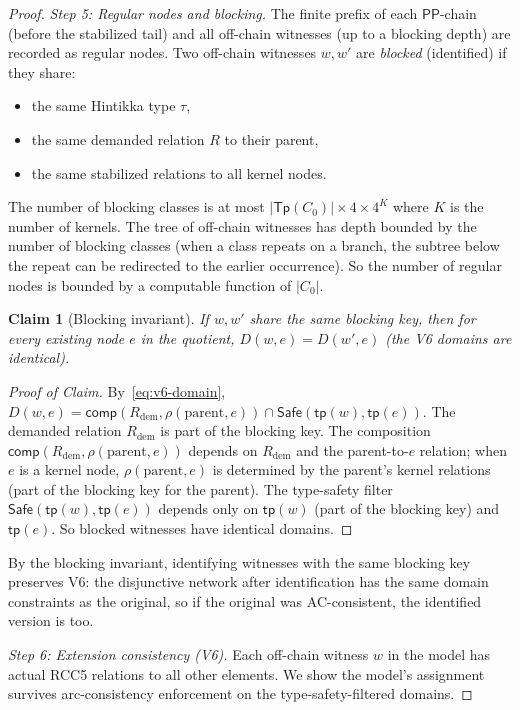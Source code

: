 \documentclass[a4paper,11pt]{article}
\newtheorem{claim}[theorem]{Claim}
\theoremstyle{definition}
\newcommand{\PP}{\ensuremath{\mathsf{PP}}}
\newcommand{\comp}{\ensuremath{\mathsf{comp}}}
\newcommand{\tp}{\ensuremath{\mathsf{tp}}}
\newcommand{\Tp}{\ensuremath{\mathsf{Tp}}}
\newcommand{\Safe}{\ensuremath{\mathsf{Safe}}}
\begin{document}
\begin{proof}
\medskip\noindent\textit{Step 5: Regular nodes and blocking.}\;
The finite prefix of each $\PP$-chain (before the stabilized tail)
and all off-chain witnesses (up to a blocking depth) are recorded as
regular nodes.  Two off-chain witnesses $w, w'$ are \emph{blocked}
(identified) if they share:
\begin{itemize}
\item the same Hintikka type $\tau$,
\item the same demanded relation $R$ to their parent,
\item the same stabilized relations to all kernel nodes.
\end{itemize}
The number of blocking classes is at most
$|\Tp(C_0)| \times 4 \times 4^K$ where $K$ is the number of kernels.
The tree of off-chain witnesses has depth bounded by the number of
blocking classes (when a class repeats on a branch, the subtree below
the repeat can be redirected to the earlier occurrence).  So the
number of regular nodes is bounded by a computable function of
$|C_0|$.

\begin{claim}[Blocking invariant]\label{claim:blocking}
If $w, w'$ share the same blocking key, then for every existing
node $e$ in the quotient, $D(w, e) = D(w', e)$ (the V6 domains are
identical).
\end{claim}

\begin{proof}[Proof of Claim]
By~\eqref{eq:v6-domain},
$D(w, e) = \comp(R_{\text{dem}}, \rho(\text{parent}, e)) \cap
\Safe(\tp(w), \tp(e))$.  The demanded relation $R_{\text{dem}}$ is
part of the blocking key.  The composition
$\comp(R_{\text{dem}}, \rho(\text{parent}, e))$ depends on
$R_{\text{dem}}$ and the parent-to-$e$ relation; when $e$ is a kernel
node, $\rho(\text{parent}, e)$ is determined by the parent's kernel
relations (part of the blocking key for the parent).  The type-safety
filter $\Safe(\tp(w), \tp(e))$ depends only on $\tp(w)$ (part of the
blocking key) and $\tp(e)$.  So blocked witnesses have identical
domains.
\end{proof}

By the blocking invariant, identifying witnesses with the same
blocking key preserves V6: the disjunctive network after
identification has the same domain constraints as the original,
so if the original was AC-consistent, the identified version is too.

\medskip\noindent\textit{Step 6: Extension consistency (V6).}\;
Each off-chain witness $w$ in the model has actual RCC5 relations to
all other elements.  We show the model's assignment survives
arc-consistency enforcement on the type-safety-filtered domains.


\end{proof}
\end{document}
